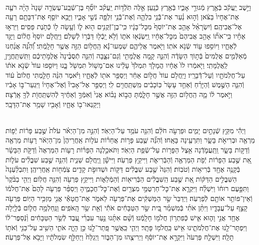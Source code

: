 \documentclass[twoside, openany, parskip=half, 11pt]{book}
\begin{document}
\begin{footnotesize}
\begin{multicols}{2}
\\
וַיֵּ֣שֶׁב יַֽעֲקֹ֔ב בְּֿאֶ֖רֶץ מְֿגוּרֵ֣י אָבִ֑יו בְּֿאֶ֖רֶץ כְּֿנָֽעַן׃ אֵ֣לֶּה תֹּֽלְֿד֣וֹת יַֽעֲקֹ֗ב יוֹסֵ֞ף בֶּן־שְֿׁבַֽע־עֶשְׂרֵ֤ה שָׁנָה֙ הָיָ֨ה רֹעֶ֤ה אֶת־אֶחָיו֙ בַּצֹּ֔אן וְֿה֣וּא נַ֗עַר אֶת־בְּֿֿנֵ֥י בִלְהָ֛ה וְֿאֶת־בְּֿֿנֵ֥י זִלְפָּ֖ה נְֿשֵׁ֣י אָבִ֑יו וַיָּבֵ֥א יוֹסֵ֛ף אֶת־דִּבָּתָ֥ם רָעָ֖ה אֶל־אֲבִיהֶֽם׃ וְֿיִשְׂרָאֵ֗ל אָהַ֤ב אֶת־יוֹסֵף֙ מִכׇּל־בָּנָ֔יו כִּֽי־בֶן־זְֿקֻנִ֥ים ה֖וּא ל֑וֹ וְֿעָ֥שָׂה ל֖וֹ כְּֿתֹ֥נֶת פַּסִּֽים׃  וַיִּרְא֣וּ אֶחָ֗יו כִּֽי־אֹת֞וֹ אָהַ֤ב אֲבִיהֶם֙ מִכׇּל־אֶחָ֔יו וַֽיִּשְׂנְֿא֖וּ אֹת֑וֹ וְֿלֹ֥א יָֽכְֿל֖וּ דַּבְּֿר֥וֹ לְֿשָׁלֹֽם׃ וַיַּֽחֲלֹ֤ם יוֹסֵף֙ חֲל֔וֹם וַיַּגֵּ֖ד לְֿאֶחָ֑יו וַיּוֹסִ֥פוּ ע֖וֹד שְֿׂנֹ֥א אֹתֽוֹ׃ וַיֹּ֖אמֶר אֲלֵיהֶ֑ם שִׁמְעוּ־נָ֕א הַֽחֲל֥וֹם הַזֶּ֖ה אֲשֶׁ֥ר חָלָֽמְֿתִּי׃ וְֿ֠הִנֵּ֠ה אֲנַ֜חְנוּ מְֿאַלְּֿמִ֤ים אֲלֻמִּים֙ בְּֿת֣וֹךְ הַשָּׂדֶ֔ה וְֿהִנֵּ֛ה קָ֥מָה אֲלֻמָּתִ֖י וְֿגַם־נִצָּ֑בָה וְֿהִנֵּ֤ה תְֿסֻבֶּ֨ינָה֙ אֲלֻמֹּ֣תֵיכֶ֔ם וַתִּֽשְׁתַּֽחֲוֶ֖יןָ לַֽאֲלֻמָּתִֽי׃  וַיֹּ֤אמְֿרוּ לוֹ֙ אֶחָ֔יו הֲמָלֹ֤ךְ תִּמְלֹךְ֙ עָלֵ֔ינוּ אִם־מָשׁ֥וֹל תִּמְשֹׁ֖ל בָּ֑נוּ וַיּוֹסִ֤פוּ עוֹד֙ שְֿׂנֹ֣א אֹת֔וֹ עַל־חֲלֹֽמֹתָ֖יו וְֿעַל־דְּֿֿבָרָֽיו׃ וַיַּֽחֲלֹ֥ם עוֹד֙ חֲל֣וֹם אַחֵ֔ר וַיְסַפֵּ֥ר אֹת֖וֹ לְֿאֶחָ֑יו וַיֹּ֗אמֶר הִנֵּ֨ה חָלַ֤מְתִּי חֲלוֹם֙ ע֔וֹד וְֿהִנֵּ֧ה הַשֶּׁ֣מֶשׁ וְֿהַיָּרֵ֗חַ וְֿאַחַ֤ד עָשָׂר֙ כּֽוֹכָבִ֔ים מִֽשְׁתַּֽחֲוִ֖ים לִֽי׃ וַיְסַפֵּ֣ר אֶל־אָבִיו֘ וְֿאֶל־אֶחָיו֒ וַיִּגְעַר־בּ֣וֹ אָבִ֔יו וַיֹּ֣אמֶר ל֔וֹ מָ֛ה הַֽחֲל֥וֹם הַזֶּ֖ה אֲשֶׁ֣ר חָלָ֑מְֿתָּ הֲב֣וֹא נָב֗וֹא אֲנִי֙ וְֿאִמְּֿךָ֣ וְֿאַחֶ֔יךָ לְֿהִשְׁתַּֽחֲוֹ֖ת לְֿךָ֖ אָֽרְֿצָה׃ וַיְקַנְאוּ־ב֖וֹ אֶחָ֑יו וְֿאָבִ֖יו שָׁמַ֥ר אֶת־הַדָּבָֽר׃

\\
וַיְהִ֕י מִקֵּ֖ץ שְֿׁנָתַ֣יִם יָמִ֑ים וּפַרְעֹ֣ה חֹלֵ֔ם וְֿהִנֵּ֖ה עֹמֵ֥ד עַל־הַיְאֹֽר׃ וְֿהִנֵּ֣ה מִן־הַיְאֹ֗ר עֹלֹת֙ שֶׁ֣בַע פָּר֔וֹת יְֿפ֥וֹת מַרְאֶ֖ה וּבְרִיאֹ֣ת בָּשָׂ֑ר וַתִּרְעֶ֖ינָה בָּאָֽחוּ׃ וְֿהִנֵּ֞ה שֶׁ֧בַע פָּר֣וֹת אֲחֵר֗וֹת עֹל֤וֹת אַֽחֲרֵיהֶן֙ מִן־הַיְאֹ֔ר רָע֥וֹת מַרְאֶ֖ה וְֿדַקּ֣וֹת בָּשָׂ֑ר וַֽתַּֽעֲמֹ֛דְֿנָה אֵ֥צֶל הַפָּר֖וֹת עַל־שְֿׂפַ֥ת הַיְאֹֽר׃ וַתֹּאכַ֣לְנָה הַפָּר֗וֹת רָע֤וֹת הַמַּרְאֶה֙ וְֿדַקֹּ֣ת הַבָּשָׂ֔ר אֵ֚ת שֶׁ֣בַע הַפָּר֔וֹת יְֿפֹ֥ת הַמַּרְאֶ֖ה וְֿהַבְּֿרִיאֹ֑ת וַיִּיקַ֖ץ פַּרְעֹֽה׃  וַיִּישָׁ֕ן וַֽיַּֽחֲלֹ֖ם שֵׁנִ֑ית וְֿהִנֵּ֣ה שֶׁ֣בַע שִׁבֳּלִ֗ים עֹל֛וֹת בְּֿקָנֶ֥ה אֶחָ֖ד בְּֿרִיא֥וֹת וְֿטֹבֽוֹת׃ וְֿהִנֵּה֙ שֶׁ֣בַע שִׁבֳּלִ֔ים דַּקּ֖וֹת וּשְׁדוּפֹ֣ת קָדִ֑ים צֹֽמְֿח֖וֹת אַֽחֲרֵיהֶֽן׃ וַתִּבְלַ֨עְנָה֙ הַשִּׁבֳּלִ֣ים הַדַּקּ֔וֹת אֵ֚ת שֶׁ֣בַע הַֽשִּׁבֳּלִ֔ים הַבְּֿרִיא֖וֹת וְֿהַמְּֿלֵא֑וֹת וַיִּיקַ֥ץ פַּרְעֹ֖ה וְֿהִנֵּ֥ה חֲלֽוֹם׃  וַיְהִ֤י בַבֹּ֨קֶר֙ וַתִּפָּ֣עֶם רוּח֔וֹ וַיִּשְׁלַ֗ח וַיִּקְרָ֛א אֶת־כׇּל־חַרְטֻמֵּ֥י מִצְרַ֖יִם וְֿאֶת־כׇּל־חֲכָמֶ֑יהָ וַיְסַפֵּ֨ר פַּרְעֹ֤ה לָהֶם֙ אֶת־חֲלֹמ֔וֹ וְֿאֵין־פּוֹתֵ֥ר אוֹתָ֖ם לְֿפַרְעֹֽה׃ וַיְדַבֵּר֙ שַׂ֣ר הַמַּשְׁקִ֔ים אֶת־פַּרְעֹ֖ה לֵאמֹ֑ר אֶת־חֲטָאַ֕י אֲנִ֖י מַזְכִּ֥יר הַיּֽוֹם׃ פַּרְעֹ֖ה קָצַ֣ף עַל־עֲבָדָ֑יו וַיִּתֵּ֨ן אֹתִ֜י בְּֿמִשְׁמַ֗ר בֵּ֚ית שַׂ֣ר הַטַּבָּחִ֔ים אֹתִ֕י וְֿאֵ֖ת שַׂ֥ר הָֽאֹפִֽים׃ וַנַּֽחַלְמָ֥ה חֲל֛וֹם בְּֿלַ֥יְלָה אֶחָ֖ד אֲנִ֣י וָה֑וּא אִ֛ישׁ כְּֿפִתְר֥וֹן חֲלֹמ֖וֹ חָלָֽמְֿנוּ׃ וְֿשָׁ֨ם אִתָּ֜נוּ נַ֣עַר עִבְרִ֗י עֶ֚בֶד לְֿשַׂ֣ר הַטַּבָּחִ֔ים וַ֨נְּֿסַפֶּר־ל֔וֹ וַיִּפְתָּר־לָ֖נוּ אֶת־חֲלֹֽמֹתֵ֑ינוּ אִ֥ישׁ כַּֽחֲלֹמ֖וֹ פָּתָֽר׃ וַיְהִ֛י כַּֽאֲשֶׁ֥ר פָּֽתַר־לָ֖נוּ כֵּ֣ן הָיָ֑ה אֹתִ֛י הֵשִׁ֥יב עַל־כַּנִּ֖י וְֿאֹת֥וֹ תָלָֽה׃ וַיִּשְׁלַ֤ח פַּרְעֹה֙ וַיִּקְרָ֣א אֶת־יוֹסֵ֔ף וַיְרִיצֻ֖הוּ מִן־הַבּ֑וֹר וַיְגַלַּח֙ וַיְחַלֵּ֣ף שִׂמְלֹתָ֔יו וַיָּבֹ֖א אֶל־פַּרְעֹֽה׃


\end{multicols}
\end{footnotesize}
\end{document}
